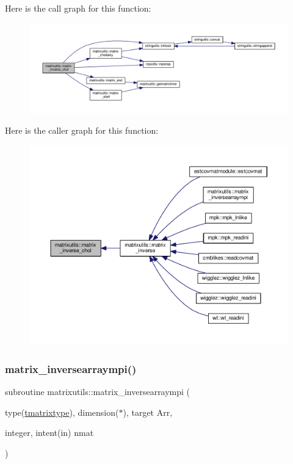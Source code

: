 Here is the call graph for this function\+:
\nopagebreak
\begin{figure}[H]
\begin{center}
\leavevmode
\includegraphics[width=350pt]{namespacematrixutils_a663d1886940de1ea811bab15859db116_cgraph}
\end{center}
\end{figure}
Here is the caller graph for this function\+:
\nopagebreak
\begin{figure}[H]
\begin{center}
\leavevmode
\includegraphics[width=350pt]{namespacematrixutils_a663d1886940de1ea811bab15859db116_icgraph}
\end{center}
\end{figure}
\mbox{\label{namespacematrixutils_ae6aceb4eee59e9d9300a4d7139011aac}} 
\subsubsection{\texorpdfstring{matrix\+\_\+inversearraympi()}{matrix\_inversearraympi()}}
{\footnotesize\ttfamily subroutine matrixutils\+::matrix\+\_\+inversearraympi (\begin{DoxyParamCaption}\item[{type(\mbox{\hyperlink{structmatrixutils_1_1tmatrixtype}{tmatrixtype}}), dimension($\ast$), target}]{Arr,  }\item[{integer, intent(in)}]{nmat }\end{DoxyParamCaption})}



